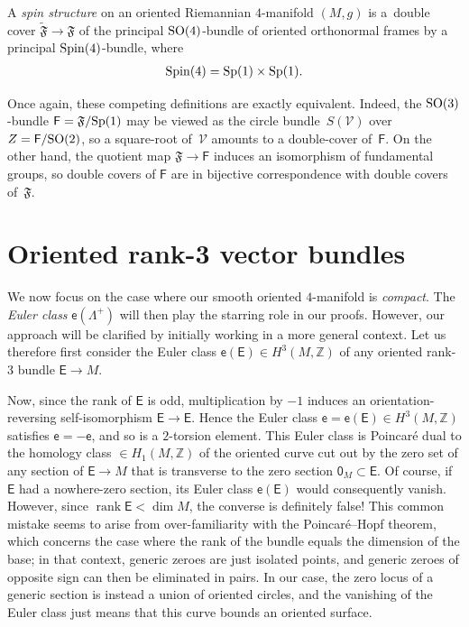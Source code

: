 \documentclass[pdftex]{sigma}
\numberwithin{equation}{section}
\def\ZZ{\mathbb{Z}}
\DeclareMathOperator{\rank}{rank}
\begin{document}
\begin{standef}
A {\em spin structure} on an oriented Riemannian $4$-manifold $(M , g )$ is a~double cover
${\widetilde{\mathfrak{F}}}\to {\mathfrak{F}}$
of the principal ${\rm SO}(4)$-bundle of oriented orthonormal frames
by a principal ${\rm Spin}(4)$-bundle, where
\begin{gather*}
{\rm Spin}(4)= {\rm Sp}(1)\times {\rm Sp}(1).
\end{gather*}
\end{standef}

Once again, these competing definitions are exactly equivalent. Indeed, the ${\rm SO}(3)$-bundle
$\mathsf{F}= \mathfrak{F}/{\rm Sp}(1)$ may be viewed as the circle bundle~$S( \mathscr{V})$ over
$Z= \mathsf{F}/{\rm SO}(2)$, so a square-root of~$ \mathscr{V}$ amounts to a double-cover of~$\mathsf{F}$.
On the other hand, the quotient map $\mathfrak{F}\to \mathsf{F}$ induces an isomorphism of fundamental groups,
so double covers of $\mathsf{F}$ are in bijective correspondence with double covers of~$\mathfrak{F}$.

\section{Oriented rank-3 vector bundles}\label{prelims}

We now focus on the case where our smooth oriented $4$-manifold is {\em compact}. The {\em Euler class}
$\mathsf{e} (\Lambda^+)$ will then play the starring role in our
proofs. However, our approach will be clarified by initially working in a more general context. Let us therefore first
 consider the Euler class $\mathsf{e} (\mathsf{E}) \in H^3(M, \ZZ)$
of any oriented rank-$3$ bundle $\mathsf{E}\to M$.


Now, since the rank of $\mathsf{E}$ is odd, multiplication by $-1$ induces an orientation-reversing
self-isomorphism $\mathsf{E}\to \mathsf{E}$. Hence the Euler class $\mathsf{e}= \mathsf{e}(\mathsf{E})\in H^3 (M,\ZZ)$ satisfies
 $\mathsf{e}= -\mathsf{e}$, and so
is a $2$-torsion element. This Euler class is Poincar\'e dual to the homology class $\in H_1(M, \ZZ)$ of the oriented curve cut out by the
zero set of any section of $\mathsf{E}\to M$ that is transverse to the zero section $\mathsf{0}_M\subset \mathsf{E}$.
Of course, if $\mathsf{E}$ had a nowhere-zero section, its Euler class
$\mathsf{e}(\mathsf{E})$ would consequently vanish. However,
 since $\rank \mathsf{E} < \dim M$, the converse is definitely false! This common mistake seems to
arise from over-familiarity with the Poincar\'e--Hopf theorem, which concerns the case where
 the rank of the bundle equals the dimension of the base; in that context,
generic zeroes are just isolated points, and generic
zeroes of opposite sign can then be eliminated in pairs. In our case, the zero locus of a generic section is instead a union of
oriented circles, and the vanishing of the Euler class just means that this curve bounds an oriented surface.
\end{document}
